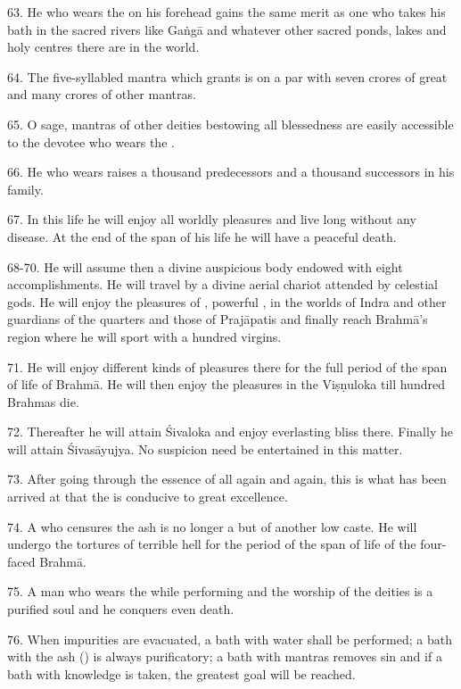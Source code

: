 63. He who wears the  on his forehead gains the same merit as one
who takes his bath in the sacred rivers like Gaṅgā and whatever other sacred
ponds, lakes and holy centres there are in the world.

64. The five-syllabled mantra which grants  is on a par with
seven crores of great and many crores of other mantras.

65. O sage, mantras of other deities bestowing all blessedness are easily
accessible to the devotee who wears the .

66. He who wears  raises a thousand predecessors and a thousand
successors in his family.

67. In this life he will enjoy all worldly pleasures and live long without any
disease. At the end of the span of his life he will have a peaceful death.

68-70. He will assume then a divine auspicious body endowed with eight
accomplishments. He will travel by a divine aerial chariot attended by celestial
gods. He will enjoy the pleasures of , powerful ,
in the worlds of Indra and other guardians of the quarters and those of
Prajāpatis and finally reach Brahmā’s region where he will sport with a hundred
virgins.

71. He will enjoy different kinds of pleasures there for the full period of
the span of life of Brahmā. He will then enjoy the pleasures in the Viṣṇuloka
till hundred Brahmas die.

72. Thereafter he will attain Śivaloka and enjoy everlasting bliss there.
Finally he will attain Śivasāyujya. No suspicion need be entertained in this
matter.

73. After going through the essence of all  again and again, this
is what has been arrived at that the  is conducive to great
excellence.

74. A  who censures the ash is no longer a  but of
another low caste. He will undergo the tortures of terrible hell for the period
of the span of life of the four-faced Brahmā.

75. A man who wears the  while performing  and the worship of the deities is a purified soul and he
conquers even death.

76. When impurities are evacuated, a bath with water shall be performed; a bath
with the ash () is always purificatory; a bath with mantras removes
sin and if a bath with knowledge is taken, the greatest goal will be reached.

